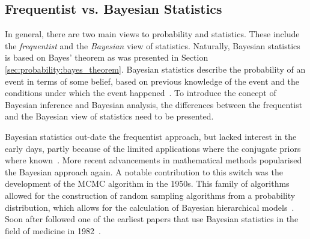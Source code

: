 \subsection{Frequentist vs. Bayesian Statistics}
\label{sec:probability:bayesian_statistics:frequentist_vs_bayesian}

In general, there are two main views to probability and statistics. These include the \textit{frequentist} and the \textit{Bayesian} view of statistics. Naturally, Bayesian statistics is based on Bayes' theorem as was presented in Section \ref{sec:probability:bayes_theorem}. Bayesian statistics describe the probability of an event in terms of some belief, based on previous knowledge of the event and the conditions under which the event happened~\cite{ref:hackenberger:2019}. To introduce the concept of Bayesian inference and Bayesian analysis, the differences between the frequentist and the Bayesian view of statistics need to be presented.

Bayesian statistics out-date the frequentist approach, but lacked interest in the early days, partly because of the limited applications where the conjugate priors where known~\cite{ref:hackenberger:2019}. More recent advancements in mathematical methods popularised the Bayesian approach again. A notable contribution to this switch was the development of the \acf{MCMC} algorithm in the 1950s. This family of algorithms allowed for the construction of random sampling algorithms from a probability distribution, which allows for the calculation of Bayesian hierarchical models~\cite{ref:hackenberger:2019}. Soon after followed one of the earliest papers that use Bayesian statistics in the field of medicine in 1982~\cite{ref:ashby:2006}.

